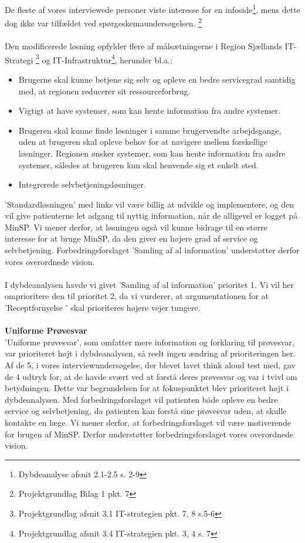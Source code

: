 De fleste af vores interviewede personer viste interesse for en infoside\footnote{Dybdeanalyse afsnit 2.1-2.5 s. 2-9}, mens dette dog ikke var tilfældet ved spørgeskemaundersøgelsen. \footnote{Projektgrundlag Bilag 1 pkt. 7}\\
\\
Den modificerede løsning opfylder flere af målsætningerne i Region Sjællands IT-Strategi \footnote{Projektgrundlag afsnit 3.1 IT-strategien pkt. 7, 8  s.5-6} og IT-Infrastruktur\footnote{Projektgrundlag afsnit 3.4 IT-strategien pkt. 3, 4 s. 7}, herunder bl.a.: 
\begin{itemize}
\item Brugerne skal kunne betjene sig selv og opleve en bedre servicegrad samtidig med, at regionen reducerer sit ressourceforbrug.
\item Vigtigt at have systemer, som kan hente information fra andre systemer. 
\item Brugeren skal kunne finde løsninger i samme brugervendte arbejdsgange, uden at brugeren skal opleve behov for at navigere mellem forskellige løsninger. Regionen ønsker systemer, som kan hente information fra andre systemer, således at brugeren kun skal henvende sig et enkelt sted.
\item Integrerede selvbetjeningsløsninger.
\end{itemize}
'Standardløsningen' med links vil være billig at udvikle og implementere, og den vil give patienterne let adgang til nyttig information, når de alligevel er logget på MinSP. Vi mener derfor, at løsningen også vil kunne bidrage til en større interesse for at bruge MinSP, da den giver en højere grad af service og selvbetjening. Forbedringsforslaget 'Samling af al information' understøtter derfor vores overordnede vision.\\
\\
I dybdeanalysen havde vi givet ’Samling af al information’ prioritet 1. Vi vil her omprioritere den til prioritet 2, da vi vurderer, at argumentationen for at ’Receptfornyelse ’ skal prioriteres højere vejer tungere.\\\\
\textbf{Uniforme Prøvesvar}\\
’Uniforme prøvesvar’, som omfatter mere information og forklaring til prøvesvar, var prioriteret højt i dybdeanalysen, så reelt ingen ændring af prioriteringen her. Af de 5, i vores interviewundersøgelse, der blevet lavet think aloud test med, gav de 4 udtryk for, at de havde svært ved at forstå deres prøvesvar og var i tvivl om betydningen. Dette var begrundelsen for at fokuspunktet blev prioriteret højt i dybdeanalysen. Med forbedringsforslaget vil patienten både opleve en bedre service og selvbetjening, da patienten kan forstå sine prøvesvar uden, at skulle kontakte en læge. Vi mener derfor, at forbedringsforslaget vil være motiverende for brugen af MinSP. Derfor understøtter forbedringsforslaget vores overordnede vision. %
